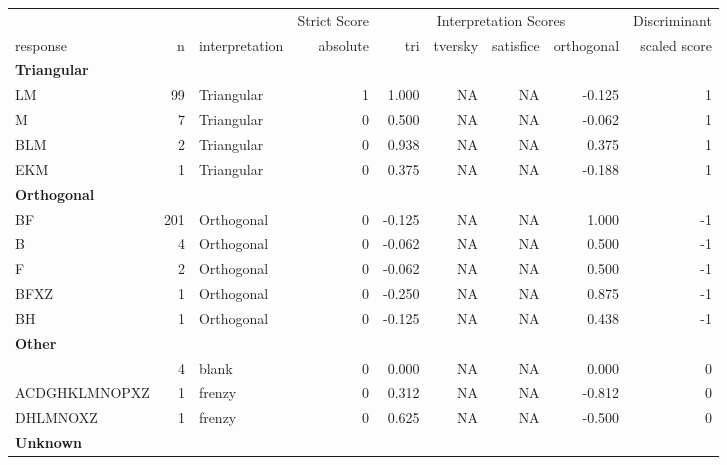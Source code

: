 \documentclass[
  letterpaper,
  DIV=11,
  numbers=noendperiod]{scrreprt}
\begin{document}
\begin{tabular}[t]{l|r|l|r|r|r|r|r|r}
\hline
\multicolumn{3}{c|}{ } & \multicolumn{1}{c|}{Strict Score} & \multicolumn{4}{c|}{Interpretation Scores} & \multicolumn{1}{c}{Discriminant} \\
\cline{4-4} \cline{5-8} \cline{9-9}
response & n & interpretation & absolute & tri & tversky & satisfice & orthogonal & scaled score\\
\hline
\multicolumn{9}{l}{\textbf{Triangular}}\\
\hline
\hspace{1em}LM & 99 & Triangular & 1 & 1.000 & NA & NA & -0.125 & 1\\
\hline
\hspace{1em}M & 7 & Triangular & 0 & 0.500 & NA & NA & -0.062 & 1\\
\hline
\hspace{1em}BLM & 2 & Triangular & 0 & 0.938 & NA & NA & 0.375 & 1\\
\hline
\hspace{1em}EKM & 1 & Triangular & 0 & 0.375 & NA & NA & -0.188 & 1\\
\hline
\multicolumn{9}{l}{\textbf{Orthogonal}}\\
\hline
\hspace{1em}BF & 201 & Orthogonal & 0 & -0.125 & NA & NA & 1.000 & -1\\
\hline
\hspace{1em}B & 4 & Orthogonal & 0 & -0.062 & NA & NA & 0.500 & -1\\
\hline
\hspace{1em}F & 2 & Orthogonal & 0 & -0.062 & NA & NA & 0.500 & -1\\
\hline
\hspace{1em}BFXZ & 1 & Orthogonal & 0 & -0.250 & NA & NA & 0.875 & -1\\
\hline
\hspace{1em}BH & 1 & Orthogonal & 0 & -0.125 & NA & NA & 0.438 & -1\\
\hline
\multicolumn{9}{l}{\textbf{Other}}\\
\hline
\hspace{1em} & 4 & blank & 0 & 0.000 & NA & NA & 0.000 & 0\\
\hline
\hspace{1em}ACDGHKLMNOPXZ & 1 & frenzy & 0 & 0.312 & NA & NA & -0.812 & 0\\
\hline
\hspace{1em}DHLMNOXZ & 1 & frenzy & 0 & 0.625 & NA & NA & -0.500 & 0\\
\hline
\multicolumn{9}{l}{\textbf{Unknown}}\\

\end{tabular}
\end{document}
